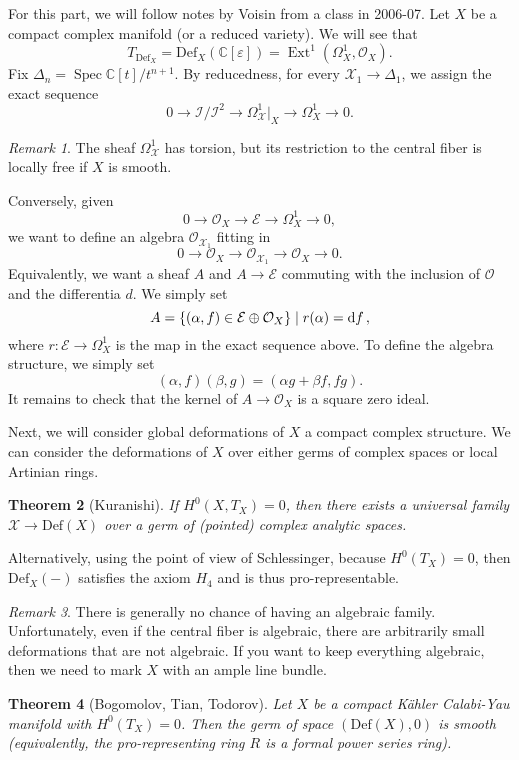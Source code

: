 \documentclass[leqno, openany]{memoir}
\newtheorem{thm}{Theorem}[section]
\theoremstyle{definition}
\theoremstyle{remark}
\newtheorem{rmk}[thm]{Remark}
\theoremstyle{plain}
\theoremstyle{definition}
\theoremstyle{remark}
\newcommand{\C}{\mathbb{C}}
\newcommand{\ep}{\varepsilon}
\newcommand{\mc}[1]{\mathcal{#1}}
\newcommand{\mr}[1]{\mathrm{#1}}
\DeclareMathOperator{\Spec}{Spec}
\DeclareMathOperator{\Ext}{Ext}
\begin{document}
For this part, we will follow notes by Voisin from a class in 2006-07. Let $X$ be a compact complex manifold (or a reduced variety). We will see that
\[ T_{\mr{Def}_X} = \mr{Def}_X(\C[\ep]) = \Ext^1(\Omega^1_X, \mc{O}_X). \]
Fix $\Delta_n = \Spec \C[t]/t^{n+1}$. By reducedness, for every $\mc{X}_1 \to \Delta_1$, we assign the exact sequence
\[ 0 \to \mc{I}/\mc{I}^2 \to \Omega^1_{\mc{X}}|_X \to \Omega^1_X \to 0. \]
\begin{rmk}
    The sheaf $\Omega^1_{\mc{X}}$ has torsion, but its restriction to the central fiber is locally free if $X$ is smooth. 
\end{rmk}
Conversely, given
\[ 0 \to \mc{O}_X \to \mc{E} \to \Omega^1_X \to 0, \]
we want to define an algebra $\mc{O}_{\mc{X_1}}$ fitting in
\[ 0 \to \mc{O}_X \to \mc{O}_{\mc{X}_1} \to \mc{O}_X \to 0. \]
Equivalently, we want a sheaf $A$ and $A \to \mc{E}$ commuting with the inclusion of $\mc{O}$ and the differentia $d$. We simply set
\[ A = \qty{(\alpha, f) \in \mc{E} \oplus \mc{O}_X} \mid r(\alpha) = \dd{f}, \]
where $r \colon \mc{E} \to \Omega^1_X$ is the map in the exact sequence above. To define the algebra structure, we simply set
\[ (\alpha, f) (\beta, g) = (\alpha g + \beta f, fg). \]
It remains to check that the kernel of $A \to \mc{O}_X$ is a square zero ideal.

Next, we will consider global deformations of $X$ a compact complex structure. We can consider the deformations of $X$ over either germs of complex spaces or local Artinian rings. 

\begin{thm}[Kuranishi]
    If $H^0(X, T_X) = 0$, then there exists a universal family $\mc{X} \to \mr{Def}(X)$ over a germ of (pointed) complex analytic spaces.
\end{thm}

Alternatively, using the point of view of Schlessinger, because $H^0(T_X) = 0$, then $\mr{Def}_X(-)$ satisfies the axiom $H_4$ and is thus pro-representable.

\begin{rmk}
    There is generally no chance of having an algebraic family. Unfortunately, even if the central fiber is algebraic, there are arbitrarily small deformations that are not algebraic. If you want to keep everything algebraic, then we need to mark $X$ with an ample line bundle.
\end{rmk}

\begin{thm}[Bogomolov, Tian, Todorov]
    Let $X$ be a compact K\"ahler Calabi-Yau manifold with $H^0(T_X) = 0$. Then the germ of space $(\mr{Def}(X), 0)$ is smooth (equivalently, the pro-representing ring $R$ is a formal power series ring).
\end{thm}
\end{document}
